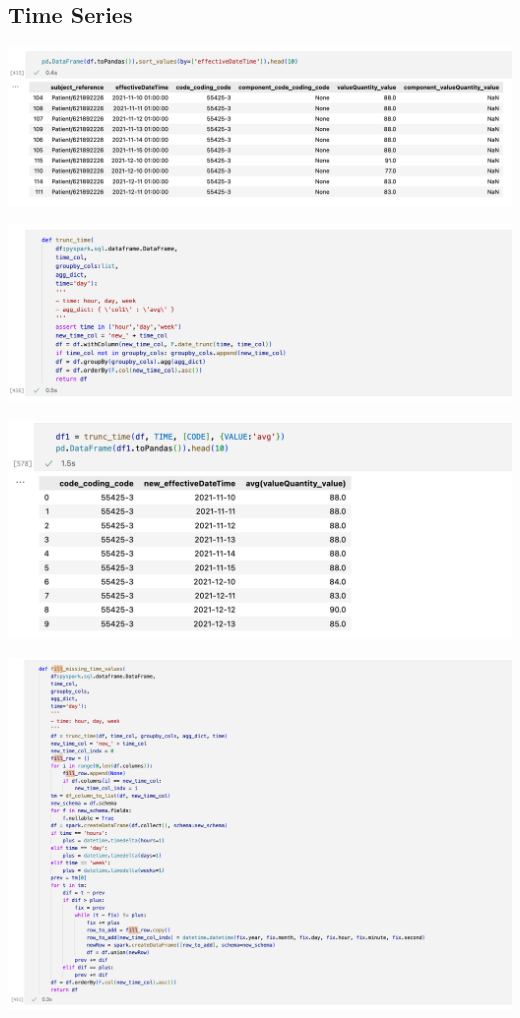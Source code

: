 \documentclass[11pt, oneside]{article}
\begin{document}
\subsection{Time Series}

\begin{center}
\includegraphics[scale=0.4]{2_sort.png}
\end{center}
\begin{center}
\includegraphics[scale=0.4]{3_trunc.png}
\end{center}
\begin{center}
\includegraphics[scale=0.4]{3_trunc_df.png}
\end{center}
\begin{center}
\includegraphics[scale=0.4]{3_fill_time.png}
\end{center}
\end{document}
